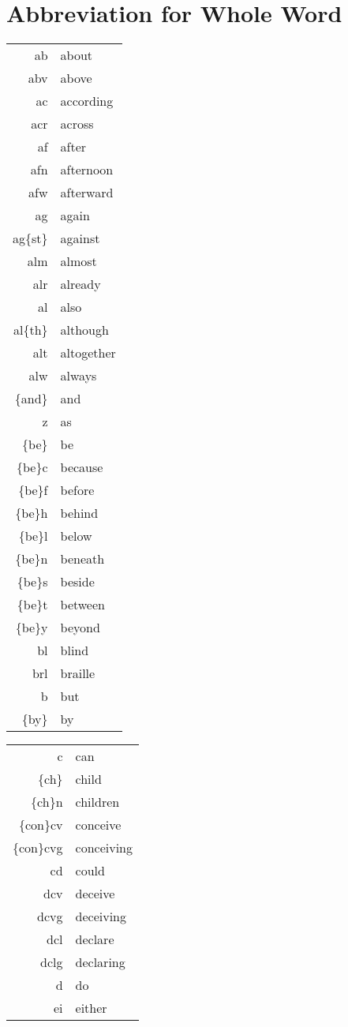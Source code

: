 \documentclass[draft]{article}
\newcommand{\mytable}[1]{%
    \enskip\begin{tabular}[t]{r|l} 
    \hline #1 \hline
    \end{tabular}\enskip}
\begin{document}
\section{Abbreviation for Whole Word}

\begin{center}
\mytable{
ab&about \\
abv&above \\
ac&according \\
acr&across \\
af&after \\
afn&afternoon \\
afw&afterward \\
ag&again \\
ag\{st\}&against \\
alm&almost \\
alr&already \\
al&also \\
al\{th\}&although \\
alt&altogether \\
alw&always \\
\{and\}&and \\
z&as \\
\{be\}&be \\
\{be\}c&because \\
\{be\}f&before \\
\{be\}h&behind \\
\{be\}l&below \\
\{be\}n&beneath \\
\{be\}s&beside \\
\{be\}t&between \\
\{be\}y&beyond \\
bl&blind \\
brl&braille \\
b&but \\
\{by\}&by \\
}
\mytable{
c&can \\
\{ch\}&child \\
\{ch\}n&children \\
\{con\}cv&conceive \\
\{con\}cvg&conceiving \\
cd&could \\
dcv&deceive \\
dcvg&deceiving \\
dcl&declare \\
dclg&declaring \\
d&do \\
ei&either \\
}
\end{center}
\end{document}
